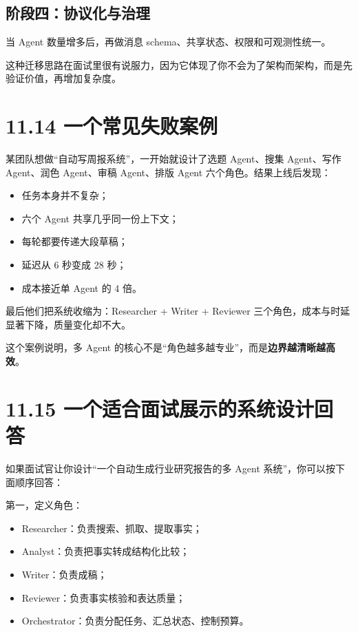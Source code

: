 \subsection{阶段四：协议化与治理}

当 Agent 数量增多后，再做消息 schema、共享状态、权限和可观测性统一。


这种迁移思路在面试里很有说服力，因为它体现了你不会为了架构而架构，而是先验证价值，再增加复杂度。


\section{11.14 一个常见失败案例}

某团队想做``自动写周报系统''，一开始就设计了选题 Agent、搜集 Agent、写作 Agent、润色 Agent、审稿 Agent、排版 Agent 六个角色。结果上线后发现：


\begin{itemize}[leftmargin=2em]
\item 任务本身并不复杂；
\item 六个 Agent 共享几乎同一份上下文；
\item 每轮都要传递大段草稿；
\item 延迟从 6 秒变成 28 秒；
\item 成本接近单 Agent 的 4 倍。
\end{itemize}

最后他们把系统收缩为：Researcher + Writer + Reviewer 三个角色，成本与时延显著下降，质量变化却不大。


这个案例说明，多 Agent 的核心不是``角色越多越专业''，而是\textbf{边界越清晰越高效}。


\section{11.15 一个适合面试展示的系统设计回答}

如果面试官让你设计``一个自动生成行业研究报告的多 Agent 系统''，你可以按下面顺序回答：


第一，定义角色：


\begin{itemize}[leftmargin=2em]
\item Researcher：负责搜索、抓取、提取事实；
\item Analyst：负责把事实转成结构化比较；
\item Writer：负责成稿；
\item Reviewer：负责事实核验和表达质量；
\item Orchestrator：负责分配任务、汇总状态、控制预算。
\end{itemize}

